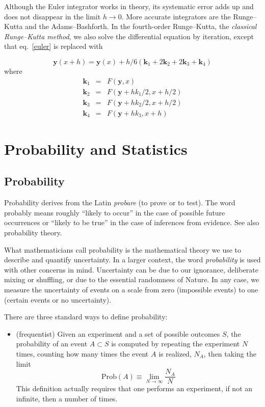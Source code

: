 \documentclass[justified, sixbynine]{tufte-book}
\theoremstyle{plain}%
\newtheorem * {corollary}{Corollary}
\theoremstyle{definition}
\theoremstyle{remark}
\newtheorem * {remark}{Remark}
\newtheorem * {note}{Note}
\begin{document}
\begin{fullwidth}
 Although the Euler integrator works in theory, its systematic error adds up and does not disappear in the limit $h\rightarrow 0$. More accurate integrators are the Runge--Kutta and the Adams--Bashforth. In the fourth-order Runge--Kutta, the {\it classical Runge--Kutta method}, we also solve the differential equation by iteration, except that eq.~\ref{euler} is replaced with

\begin{equation}
\mathbf{y}(x+h) = \mathbf{y}(x) + h/6 (\mathbf{k}_1+2\mathbf{k}_2+2\mathbf{k}_3+\mathbf{k}_4)\label{rungekatta}
\end{equation}
where
\begin{eqnarray}
\mathbf{k}_1 &=& F(\mathbf{y}, x) \\
\mathbf{k}_2 &=& F(\mathbf{y}+h k_1/2, x+h/2) \\
\mathbf{k}_3 &=& F(\mathbf{y}+h k_2/2, x+h/2) \\
\mathbf{k}_4 &=& F(\mathbf{y}+h k_3, x+h)
\end{eqnarray}

\chapter{Probability and Statistics}

\goodbreak\section{Probability}


Probability derives from the Latin {\it probare} (to prove or to test). The word
probably means roughly ``likely to occur'' in the case of possible future
occurrences or ``likely to be true'' in the case of inferences from
evidence. See also probability theory.

What mathematicians call probability is the mathematical theory we use to
describe and quantify uncertainty. In a larger context, the word {\it probability}
is used with other concerns in mind. Uncertainty can be due to our
ignorance, deliberate mixing or shuffling, or due to the essential
randomness of Nature. In any case, we measure the uncertainty of events on a
scale from zero (impossible events) to one (certain events or no
uncertainty).

There are three standard ways to define probability:

\begin{itemize}
\item  (frequentist) Given an experiment and a set of possible outcomes $S$,
the probability of an event $A\subset S$ is computed by repeating the
experiment $N$ times, counting how many times the event $A$ is realized, $N_A
$, then taking the limit
\begin{equation}
\textrm{Prob}(A)\equiv \lim_{N\rightarrow \infty }\frac{N_A}N
\end{equation}
This definition actually requires that one performs an experiment,
if not an infinite, then a number of times.


\end{itemize}
\end{fullwidth}
\end{document}
